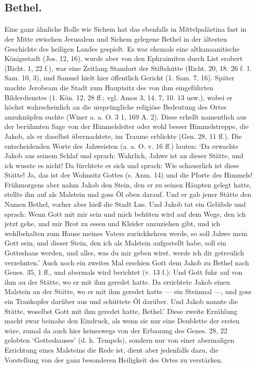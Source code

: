 \documentclass[a4paper, 11pt, oneside]{article}
\begin{document}
\subsection{Bethel.}
\paragraph{}
Eine ganz ähnliche Rolle wie Sichem hat das ebenfalls in Mittelpalästina fast in der Mitte zwischen Jerusalem und Sichem gelegene Bethel in der ältesten Geschichte des heiligen Landes gespielt. Es war ehemals eine altkanaanitische Königsstadt (Jos. 12, 16), wurde aber von den Ephraimiten durch List erobert (Richt. 1, 22 f.), war eine Zeitlang Standort der Stiftshütte (Richt. 20, 18. 26 f. 1. Sam. 10, 3), und Samuel hielt hier öffentlich Gericht (1. Sam. 7, 16). Später machte Jerobeam die Stadt zum Hauptsitz des von ihm eingeführten Bilderdienstes (1. Kön. 12, 28 ff.; vgl. Amos 3, 14. 7, 10. 13 usw.), wobei er höchst wahrscheinlich an die ursprüngliche religiöse Bedeutung des Ortes anzuknüpfen suchte (Winer a. a. O. 3 1, 169 A. 2). Diese erhellt namentlich aus der berühmten Sage von der Himmelsleiter oder wohl besser Himmelstreppe, die Jakob, als er daselbst übernachtete, im Traume erblickte (Gen. 28, 11 ff.). Die entscheidenden Worte des Jahweisten (a. a. O. v. 16 ff.) lauten: `Da erwachte Jakob aus seinem Schlaf und sprach: Wahrlich, Jahwe ist an dieser Stätte, und ich wusste es nicht! Da fürchtete er sich und sprach: Wie schauerlich ist diese Stätte! Ja, das ist der Wohnsitz Gottes (s. Anm. 14) und die Pforte des Himmels! Frühmorgens aber nahm Jakob den Stein, den er zu seinen Häupten gelegt hatte, stellte ihn auf als Malstein und goss Öl oben darauf. Und er gab jener Stätte den Namen Bethel, vorher aber hieß die Stadt Lus. Und Jakob tat ein Gelübde und sprach: Wenn Gott mit mir sein und mich behüten wird auf dem Wege, den ich jetzt gehe, und mir Brot zu essen und Kleider anzuziehen gibt, und ich wohlbehalten zum Hause meines Vaters zurückkehren werde, so soll Jahwe mein Gott sein, und dieser Stein, den ich als Malstein aufgestellt habe, soll ein Gotteshaus werden, und alles, was du mir geben wirst, werde ich dir getreulich verzehnten.' Auch noch ein zweites Mal erschien Gott dem Jakob zu Bethel nach Genes. 35, 1 ff., und abermals wird berichtet (v. 13 f.): Und Gott fuhr auf von ihm au der Stätte, wo er mit ihm geredet hatte. Da errichtete Jakob einen Malstein an der Stätte, wo er mit ihm geredet hatte --- ein Steinmal ---, und goss ein Trankopfer darüber aus und schüttete Öl darüber. Und Jakob nannte die Stätte, woselbst Gott mit ihm geredet hatte, Bethel.' Diese zweite Erzählung macht zwar beinahe den Eindruck, als wenn sie nur eine Doublette der ersten wäre, zumal da auch hier keineswegs von der Erbauung des Genes. 28, 22 gelobten `Gotteshauses' (d. h. Tempels), sondern nur von einer abermaligen Errichtung eines Malsteins die Rede ist, dient aber jedenfalls dazu, die Vorstellung von der ganz besonderen Heiligkeit des Ortes zu verstärken.
\end{document}

